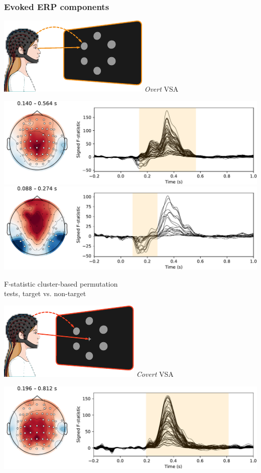 \documentclass{kul-ulille-beamer}
\begin{document}
\begin{frame}
  \frametitle{Evoked ERP components}
  \small
  \begin{minipage}[t]{.45\textwidth}
    \includegraphics[width=.2\textwidth]{figures/covert/attention_overt.pdf}
    \hspace{.5em}
    \emph{Overt} VSA
    \smallskip

    \includegraphics[width=\textwidth]{figures/covert/erps/erp_overt_cluster-1.pdf}
    \includegraphics[width=\textwidth]{figures/covert/erps/erp_overt_cluster-0.pdf}
    \smallskip

    \small
    F-statistic cluster-based permutation \\ tests, target vs. non-target
  \end{minipage}\hfill%
  \begin{minipage}[t]{.45\textwidth}
    \includegraphics[width=.2\textwidth]{figures/covert/attention_covert.pdf}
    \hspace{.5em}
    \emph{Covert} VSA
    \smallskip

    \includegraphics[width=\textwidth]{figures/covert/erps/erp_covert_cluster-0.pdf}
    \smallskip


\end{minipage}
\end{frame}
\end{document}
